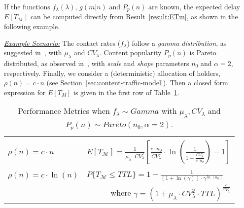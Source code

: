 \documentclass[journal]{IEEEtran}
\begin{document}
If the functions $f_{\lambda}(\lambda)$, $g(m|n)$ and $P_{p}(n)$ are known, the expected delay $E[T_{\mathcal{M}}]$ can be computed directly from Result~\ref{result:ETm}, as shown in the following example. 

\textit{\underline{Example Scenario:}} The contact rates ($f_{\lambda}$) follow a \textit{gamma distribution}, as suggested in~\cite{Passarella-aggregateIT}, with $\mu_{\lambda}$ and $CV_{\lambda}$.  Content popularity $P_{p}(n)$ is Pareto distributed, as observed in~\cite{youtube-traffic-from-edge, RSS-traffic-characteristics, pavlos-dataset-AOC}, with \textit{scale} and \textit{shape} parameters $n_{0}$ and $\alpha=2$, respectively. Finally, we consider a (deterministic) allocation of holders, $\rho(n)=c\cdot n$ (see Section~\ref{sec:content-traffic-model}). Then a closed form expression for $E[T_{M}]$ is given in the first row of Table~\ref{table:expressions-case-study}.

\begin{table}[!h]
\centering
\caption{Performance Metrics when $f_{\lambda}\sim Gamma$ with $\mu_{\lambda}, CV_{\lambda}$ and $P_{p}(n)\sim Pareto(n_{0},\alpha=2)$.}
\small
\begin{tabular}{|l|l|}
\hline
{}&{}\\
\hspace{-0.02\linewidth}
$\rho(n) = c\cdot n$ &
\hspace{-0.02\linewidth}
$E[T_{\mathcal{M}}]=\frac{1}{\mu_{\lambda}\cdot CV_{\lambda}^{2}} \left[\frac{c\cdot n_{0}}{CV_{\lambda}^{2}}\cdot\ln\left(\frac{1}{1-\frac{CV_{\lambda}^{2}}{c\cdot n_{0}}}\right)-1\right]$\\
{}&{}\\
\hline
\hspace{-0.02\linewidth}
$\rho(n) = c\cdot \ln(n)$ \hspace{-0.02\linewidth} &
\hspace{-0.02\linewidth}
$P\lbrace T_{\mathcal{M}}\leq TTL\rbrace = 1-\frac{1}{(1+\ln(\gamma))\cdot \gamma^{\ln(n_{0})}}$  \\
{}&
\multicolumn{1}{r|}{
\hspace{-0.02\linewidth}
where $\gamma = (1+\mu_{\lambda}\cdot CV_{\lambda}^{2}\cdot TTL)^{\frac{c}{CV_{\lambda}^{2}}}$
}\\
\hline
\end{tabular}
\normalsize
\label{table:expressions-case-study}
\end{table}
\end{document}
